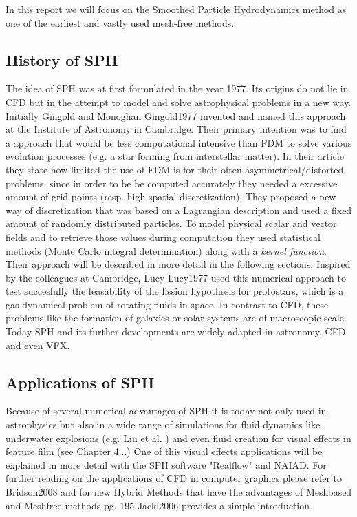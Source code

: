 In this report we will focus on the Smoothed Particle Hydrodynamics method as one of the earliest
and vastly used mesh-free methods.

\subsection{History of SPH}

The idea of SPH was at first formulated in the year 1977. Its origins do not lie in CFD but in the attempt to model and solve astrophysical problems in a new way. Initially Gingold and Monoghan Gingold1977 invented and named this approach at the Institute of Astronomy in Cambridge. Their primary intention was to find a approach that would be less computational intensive than FDM to solve various evolution processes (e.g. a star forming from interstellar matter). In their article they state how limited the use of FDM
is for their often asymmetrical/distorted problems, since in order to be be computed accurately they needed a excessive amount of grid points (resp. high spatial discretization). They proposed a new way of discretization that was based on a Lagrangian description and used a fixed amount of randomly distributed particles. To model physical scalar and vector fields and to retrieve those values during computation they used statistical methods (Monte Carlo integral determination) along with a \emph{kernel function}. Their approach will be described in more detail in the following sections.  
Inspired by the colleagues at Cambridge, Lucy Lucy1977 used this numerical approach to test succesfully the feasability of the fission hypothesis for protostars, which is a gas dynamical problem of rotating fluids in space. In contrast to CFD, these problems like the formation of galaxies or solar systems are of macroscopic scale.
Today SPH and its further developments are widely adapted in astronomy, CFD and even VFX. 


\subsection{Applications of SPH}
Because of several numerical advantages of SPH it is today not only used in astrophysics but also in a wide
range of simulations for fluid dynamics like underwater explosions (e.g. Liu et al. ) and even fluid creation
for visual effects in feature film (see Chapter 4...) One of this visual effects applications will be explained
in more detail with the SPH software "Realflow" and NAIAD. For further reading on the applications of CFD in computer graphics please refer to Bridson2008 and for new Hybrid Methods that have the advantages of Meshbased and Meshfree methods pg. 195 Jackl2006 provides a simple introduction. 


